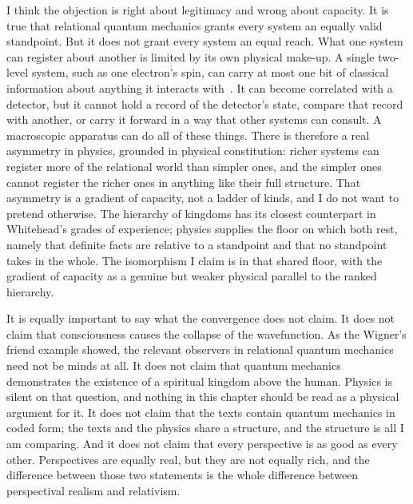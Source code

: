 I think the objection is right about legitimacy and wrong about capacity.
It is true that relational quantum mechanics grants every system an equally valid standpoint.
But it does not grant every system an equal reach.
What one system can register about another is limited by its own physical make-up.
A single two-level system, such as one electron's spin, can carry at most one bit of classical information about anything it interacts with~\citep{NielsenChuang2000}.
It can become correlated with a detector, but it cannot hold a record of the detector's state, compare that record with another, or carry it forward in a way that other systems can consult.
A macroscopic apparatus can do all of these things.
There is therefore a real asymmetry in physics, grounded in physical constitution: richer systems can register more of the relational world than simpler ones, and the simpler ones cannot register the richer ones in anything like their full structure.
That asymmetry is a gradient of capacity, not a ladder of kinds, and I do not want to pretend otherwise.
The hierarchy of kingdoms has its closest counterpart in Whitehead's grades of experience; physics supplies the floor on which both rest, namely that definite facts are relative to a standpoint and that no standpoint takes in the whole.
The isomorphism I claim is in that shared floor, with the gradient of capacity as a genuine but weaker physical parallel to the ranked hierarchy.

It is equally important to say what the convergence does not claim.
It does not claim that consciousness causes the collapse of the wavefunction.
As the Wigner's friend example showed, the relevant observers in relational quantum mechanics need not be minds at all.
It does not claim that quantum mechanics demonstrates the existence of a spiritual kingdom above the human.
Physics is silent on that question, and nothing in this chapter should be read as a physical argument for it.
It does not claim that the \bahai texts contain quantum mechanics in coded form; the texts and the physics share a structure, and the structure is all I am comparing.
And it does not claim that every perspective is as good as every other.
Perspectives are equally real, but they are not equally rich, and the difference between those two statements is the whole difference between perspectival realism and relativism.

